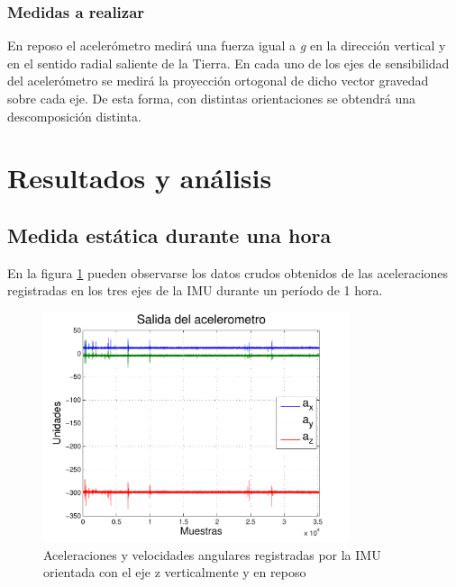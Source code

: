 \documentclass[spanish,12pt,a4paper,titlepage]{report}
\begin{document}
\subsubsection*{Medidas a realizar}
En reposo el acelerómetro medirá una fuerza igual a \textit{g} en la dirección vertical y en el sentido radial saliente de la Tierra. En cada uno de los ejes de sensibilidad del acelerómetro se medirá la proyección ortogonal de dicho vector gravedad sobre cada eje. De esta forma, con distintas orientaciones se obtendrá una descomposición distinta.

\section{Resultados y análisis}
\subsection{Medida estática durante una hora}

En la figura \ref{fig:1hora} pueden observarse los datos crudos obtenidos de las aceleraciones registradas en los tres ejes de la IMU durante un período de 1 hora.

\begin{figure}[h!]
  \begin{center}
    \includegraphics[width=0.8\textwidth]{./pics/1hora.pdf}
  \end{center}
  \vspace{-20pt}
  \caption{Aceleraciones y velocidades angulares registradas por la IMU orientada con el eje z verticalmente y en reposo}
  \label{fig:1hora}
\end{figure}
\end{document}
